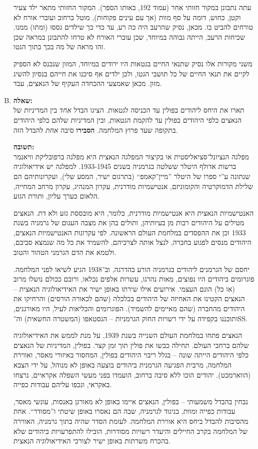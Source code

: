 \documentclass[a4paper]{article}
\newcommand\hl[1]   {#1}
\begin{document}
\begin{enumerate}[A.]
			עתה נתבונן במקור חזותי אחר (עמוד 192, באותו הספר). המקור החזותי מתאר ילד צעיר וקטן, כחוש, דומה על סף מוות (אך עם עינים פקוחות), מוטל ברחוב ועוברי אורח לא טורחים להביט בו. מכאן, נסיק שהרעב היה כה רע, עד כדי כך שילדים גססו (ומתו) ממנו. שכיחות הרעב, הייתה גבוהה במיוחד, שכן עוברי האורח לא טרחו להתבונן במראה שכן זהו מראה של מה בכך בתוך הגטו. 
			
			משני מקורות אלו נסיק שתנאי החיים בגטאות היו ירודים במיוחד, המזון שנכנס לא הספיק לקיים את תנאי החיים של כל תושבי הגטו, ולכן ילדים אף סיכנו את חייהם בנסיון להשיג מזון. מכאן שאמצעי ההכחדה העקיף של הנאצים, עבד. 
			
			\item \textbf{שאלה: }\\
			תארו את היחס ליהודים בפולין עד הכניסה לגטאות. הציגו הבדל \textit{אחד} בין המדיניות של הנאצים כלפי היהודים בפולין עד להקמת הגטאות, ובין המדיניות שלהם כלפי היהודים בתקופה שעד פרוץ המלחמה. \textbf{הסבירו} סיבה \textit{אחת} להבדל הזה. 
			
			\textbf{תשובה: }\\
			מפלגה הנציונל־סציאליסטית או בקיצור המפלגה ה\hl{נאצית} היא מפלגה ברפובליקת וויאנמר ברשות \hl{אדולף היטלר} ששלטה בגרמניה בשנים 1933-1945. למפלגה יש אידיאולוגיה שנתונה ע''י ספרו של היטלר ''מיין־קאמפ`` (בתרגום ישיר, המסע שלי), ועקרונותיהם הם שלילת הדמוקרטיה והקומוניזם, אנטישמיות מודרנית, עקרון המנהיג, עקרון מרחב המחייה, הלאום כערך עליון, ותורת הגזע. 
			
			האנטישמיות הנאצית היא אנטישמיות מודרנית, כלומר, היא מובססת גזע ולא דת. הנאצים מטילים על היהודים רבות מן בעיותיהן, ותולים בהן את מצבה העגום של גרמניה בשנת 1933 וכן את ההפסדים במלחמת העולם הראשונה. לפי עקרונות האנטישמיות הנאצים, היהודים מנסים לפגוע בחברה, לנצל אותה לצרכיהם, להשמיד את כל מה שנמצא סביבם, ולטמא את הדם הגרמני הטהור והטוב. 
			
			יחסם של הגרמנים ליהודים בגרמניה הורע בהדרגה, וב־1938 הגיע לשיאו לפני המלחמה. פוגרומים ביהודים היו נפוצים, מאות נהרגו, עשרות אלפים נכלאו, ורובם ככולם נושלו מרוב (או כל) הונם העצמי. אירועים אילו שירתו באופן ישיר את האידיאולוגיה הנאצית – הנאצים הקטינו את האחיזה של היהודים בכלכלה (שהם לכאורה הורסים) והרחיקו את היהודים מהחברה (שהם מאיימים להשמיד). הפוגרומים והכליאות לעיל, היו מאורגנים, ותוכננו בקפידה על ידי רשויות החוק הגרמניות – הגסטאפו (המשטרה החשאית) וה־SS. 
			
			הנאצים פתחו במלחמת העולם השנייה בשנת 1939, על מנת לממש את האידיאולוגיה שלהם ברחבי העולם. תחילה כבשו את פולין תוך זמן קצר. בפולין, המדיניות של הנאצים כלפי היהודים הייתה שונה – בגלל ריבוי היהודים בפולין, המחסור באיזורי מאסר, ואווירת המלחמה, מרבית הפגיעה הגרמנית ביהודים בוצעה באופן לא מנוהל, על ידי הצבא (הווארמכט). יהודים הוכו ללא סיבה ברחוב, הועמדו בפני מעשי השפלה אקראיים, נרצחו באקראי, ונכפו עליהם עבודות כפייה. 
			
			נבחין בהבדל משמעותי – בפולין, הנאצים איימו באופן לא מאורגן באנסות, עונשי מאסר, עבודות כפייה ומוות, בניגוד לגרמניה, שבה הם נאסרו באופן שיטתי ו''מסודר``. אחת מהסיבות להבדל ביחס היא אווירת המלחמה. לעומת הסדר שהיה בתוך גרמניה, האווירה של המלחמה בקרב החיילים והיעדר רשויות מסודרות, הובילו להתפרעויות ביהודים שלא בהכרח משרתות באופן ישיר לצורכי האידיאולוגיה הנאצית. 
			
		\end{enumerate}
	
\end{document}

